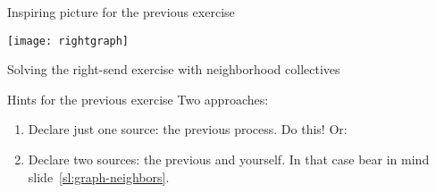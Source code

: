 \begin{exerciseframe}[rightgraph]
  \hyperlink{exserialsend}{}

  
\end{exerciseframe}

\begin{numberedframe}{Inspiring picture for the previous exercise}
  \label{fig:rightgraph}

  \texttt{[image: rightgraph]}

  Solving the right-send exercise with neighborhood
  collectives
\end{numberedframe}

\begin{numberedframe}{Hints for the previous exercise}
  Two approaches:
  \begin{enumerate}
  \item Declare just one source: the previous process. Do this! Or:
  \item Declare two sources: the previous and yourself.
    In that case bear in mind slide~\ref{sl:graph-neighbors}.
  \end{enumerate}
\end{numberedframe}

\endinput

\begin{numberedframe}{}
\end{numberedframe}

